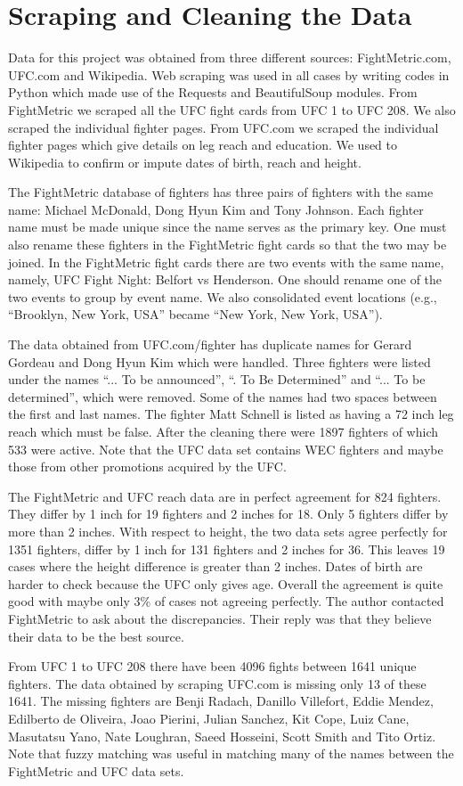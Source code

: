 \clearpage
\section{Scraping and Cleaning the Data}
\label{cleaning_data}
Data for this project was obtained from three different sources:
FightMetric.com, UFC.com and Wikipedia. Web scraping was used
in all cases by writing codes in Python which made use
of the Requests and BeautifulSoup modules. From FightMetric we scraped all the UFC fight
cards from UFC 1 to UFC 208. We also scraped the individual fighter
pages. From UFC.com we scraped the individual fighter pages which
give details on leg reach and education. We used to Wikipedia
to confirm or impute dates of birth, reach and height.

The FightMetric database of fighters has three pairs of fighters
with the same name: Michael McDonald, Dong Hyun Kim and
Tony Johnson. Each fighter name must be made unique since the name
serves as the primary key. One must also rename these fighters
in the FightMetric fight cards so that the two may be joined.
In the FightMetric fight cards there are two events with the same
name, namely, UFC Fight Night: Belfort vs Henderson. One should rename
one of the two events to group by event name. We also consolidated
event locations (e.g., ``Brooklyn, New York, USA'' became ``New York, New York, USA'').

The data obtained from UFC.com/fighter has duplicate names for
Gerard Gordeau and Dong Hyun Kim which were handled. Three fighters were
listed under the names ``... To be announced'', ``. To Be Determined'' and
``... To be determined'', which were removed. Some of the names had
two spaces between the first and last names. The fighter Matt Schnell
is listed as having a 72 inch leg reach which must be false.
After the cleaning there were 1897 fighters of which 533 were active. Note that
the UFC data set contains WEC fighters and maybe those from other promotions
acquired by the UFC.

The FightMetric and UFC reach data are in perfect agreement for 824 fighters.
They differ by 1 inch for 19 fighters and 2 inches for 18. Only 5 fighters
differ by more than 2 inches.
With respect to height, the two data sets agree perfectly for 1351 fighters,
differ by 1 inch for 131 fighters and 2 inches for 36. This leaves 19
cases where the height difference is greater than 2 inches. Dates of birth
are harder to check because the UFC only gives age.
Overall the agreement is quite good with maybe only 3\% of cases not
agreeing perfectly.
The author contacted FightMetric to ask about the discrepancies. Their reply
was that they believe their data to be the best source.

From UFC 1 to UFC 208 there have been 4096 fights between 1641 unique fighters. The
data obtained by scraping UFC.com is missing only 13 of these 1641. The missing
fighters are Benji Radach, Danillo Villefort, Eddie Mendez, Edilberto de Oliveira,
Joao Pierini, Julian Sanchez, Kit Cope, Luiz Cane, Masutatsu Yano, Nate Loughran,
Saeed Hosseini, Scott Smith and Tito Ortiz. Note that fuzzy matching was useful
in matching many of the names between the FightMetric and UFC data sets.

